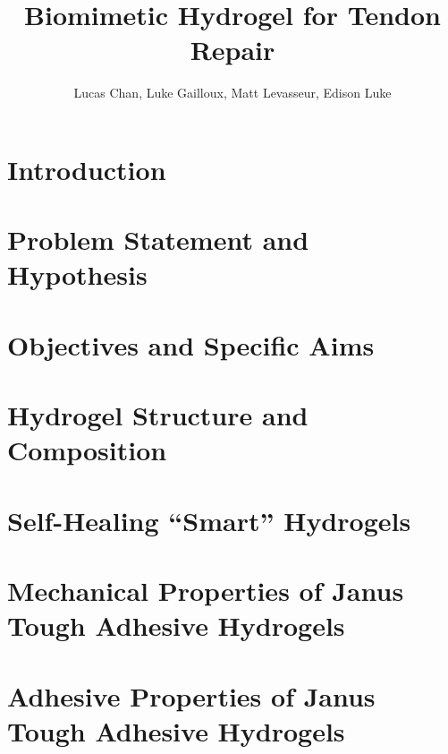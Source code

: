 \documentclass[
    letterpaper,
    10pt,
    unnumberedsections,
    twoside
]{LTJournalArticle}
\title{Biomimetic Hydrogel for Tendon Repair}
\author{Lucas Chan, Luke Gailloux, Matt Levasseur, Edison Luke}
\begin{document}
    \maketitle 

    \section{Introduction}

    

    \section{Problem Statement and Hypothesis}

    
    
    \section{Objectives and Specific Aims}

    

    \section{Hydrogel Structure and Composition}

    

    

    \section{Self-Healing ``Smart'' Hydrogels}

    

    \section{Mechanical Properties of Janus Tough Adhesive Hydrogels}

    

    \section{Adhesive Properties of Janus Tough Adhesive Hydrogels}

    
\end{document}
